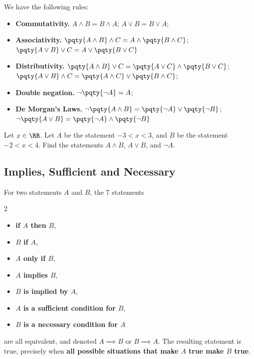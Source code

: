 \documentclass{article}
\begin{document}
We have the following rules:
\begin{itemize}
    \item \textbf{Commutativity.} \(A \land B = B \land A\); \(A \lor B = B \lor A\);
    \item \textbf{Associativity.} \(\pqty{A \land B} \land C = A \land \pqty{B \land C}\); \(\pqty{A \lor B} \lor C = A \lor \pqty{B \lor C}\)
    \item \textbf{Distributivity.} \(\pqty{A \land B} \lor C = \pqty{A \lor C} \land \pqty{B \lor C}\); \(\pqty{A \lor B} \land C = \pqty{A \land C} \lor \pqty{B \land C}\);
    \item \textbf{Double negation.} \(\lnot \pqty{\lnot A} = A\);
    \item \textbf{De Morgan's Laws.} \(\lnot \pqty{A \land B} = \pqty{\lnot A} \lor \pqty{\lnot B}\); \(\lnot \pqty{A \lor B} = \pqty{\lnot A} \land \pqty{\lnot B}\)
\end{itemize}

\begin{example}
    Let \(x \in \RR\). Let \(A\) be the statement \(-3 < x < 3\), and \(B\) be the statement \(-2 < x < 4\). Find the statements \(A \land B\), \(A \lor B\), and \(\lnot A\).
\end{example}

\subsection{Implies, Sufficient and Necessary}

For two statements \(A\) and \(B\), the \(7\) statements
\begin{multicols}{2}
    \begin{itemize}
        \item \textbf{if \(A\) then \(B\)},
        \item \textbf{\(B\) if \(A\)},
        \item \textbf{\(A\) only if \(B\)},
        \item \textbf{\(A\) implies \(B\)},
        \item \textbf{\(B\) is implied by \(A\)},
        \item \textbf{\(A\) is a sufficient condition for \(B\)},
        \item \textbf{\(B\) is a necessary condition for \(A\)}
    \end{itemize}
\end{multicols}
are all equivalent, and denoted \(A \implies B\) or \(B \implies A\). The resulting statement is true, precisely when \textbf{all possible situations that make \(A\) true make \(B\) true}.
\end{document}

